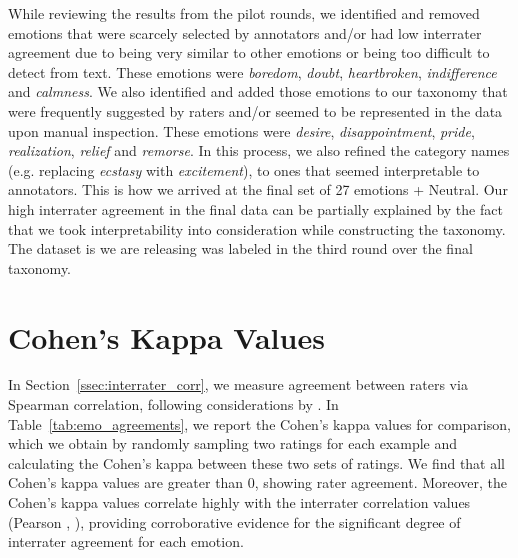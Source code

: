 \documentclass[11pt,a4paper]{article}
\begin{document}
While reviewing the results from the pilot rounds, we identified and removed emotions that were scarcely selected by annotators and/or had low interrater agreement due to being very similar to other emotions or being too difficult to detect from text. These emotions were \emph{boredom}, \emph{doubt}, \emph{heartbroken}, \emph{indifference} and \emph{calmness}. We also identified and added those emotions to our taxonomy that were frequently suggested by raters and/or seemed to be represented in the data upon manual inspection. These emotions were \emph{desire}, \emph{disappointment}, \emph{pride}, \emph{realization}, \emph{relief} and \emph{remorse}. In this process, we also refined the category names (e.g. replacing \emph{ecstasy} with \emph{excitement}), to ones that seemed interpretable to annotators. This is how we arrived at the final set of 27 emotions + Neutral. Our high interrater agreement in the final data can be partially explained by the fact that we took interpretability into consideration while constructing the taxonomy. The dataset is we are releasing was labeled in the third round over the final taxonomy. 

\section{Cohen's Kappa Values}
\label{sec:appendix_kappa}

In Section~\ref{ssec:interrater_corr}, we measure agreement between raters via Spearman correlation, following considerations by \citet{delgado2019cohen}. In Table~\ref{tab:emo_agreements}, we report the Cohen's kappa values for comparison, which we obtain by randomly sampling two ratings for each example and calculating the Cohen's kappa between these two sets of ratings. We find that all Cohen's kappa values are greater than 0, showing rater agreement. Moreover, the Cohen's kappa values correlate highly with the interrater correlation values (Pearson , ), providing corroborative evidence for the significant degree of interrater agreement for each emotion. 
\end{document}
